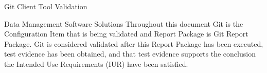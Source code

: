 \documentclass[10pt]{tlc-article}
\begin{document}
  \global\def\configurationitem{Git}

  \tlcTitlePageAndTableOfContents
    {Git Client Tool Validation}

    {Data Management Software Solutions}
    {Throughout this document Git is the Configuration Item that is being
     validated and Report Package is Git Report Package.  Git is
     considered validated after this Report Package has been executed, test
     evidence has been obtained, and that test evidence supports the conclusion
     the Intended Use Requirements (IUR) have been satisfied.}

  
\end{document}

